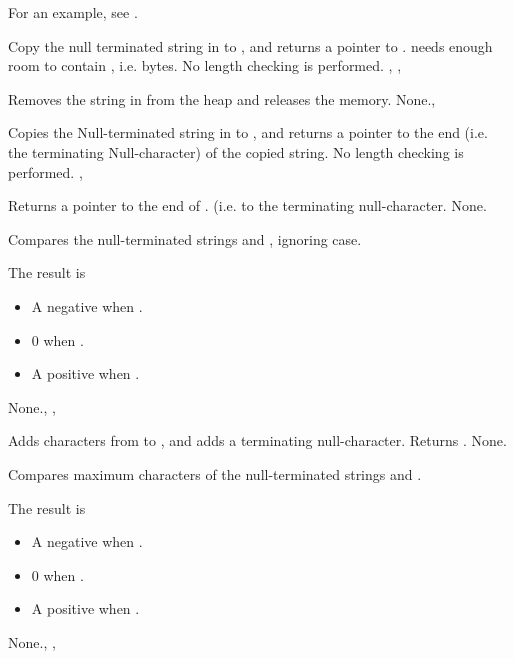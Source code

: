 For an example, see .

{ 
Copy the null terminated string in  to , and
returns a pointer to .  needs enough room to contain
, i.e.  bytes.
}
{No length checking is performed.}{ , , }



{
Removes the string in  from the heap and releases the memory.
}
{None.}{, }



{
Copies the Null-terminated string in  to , and
returns a pointer to the end (i.e. the terminating Null-character) of the
copied string.
}
{No length checking is performed.}
{, }



{
Returns a pointer to the end of . (i.e. to the terminating
null-character.
}
{None.}{}



{
Compares the null-terminated strings  and , ignoring case.

The result is 
\begin{itemize}
\item A negative  when .
\item 0 when .
\item A positive  when .
\end{itemize}
}
{None.}{, , }



{
Adds  characters from  to , and adds a
terminating null-character. Returns .
}
{None.}{}



{
Compares maximum  characters of the null-terminated strings 
 and . 

The result is 
\begin{itemize}
\item A negative  when .
\item 0 when .
\item A positive  when .
\end{itemize}
}
{None.}{, , }


